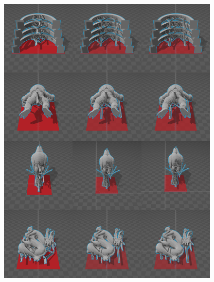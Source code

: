 \documentclass[11pt, a4paper]{article}
\begin{document}
	\newpage
	\renewcommand\refname{References}
	\raggedright
	
	
	\newpage

	\begin{appendix}
	\begin{figure}[!ht]
  		\centering
      	\includegraphics[width=\textwidth]{totalp1.png}
	\end{figure}
	\begin{figure}[!ht]
  		\centering

\end{figure}
\end{appendix}
\end{document}
